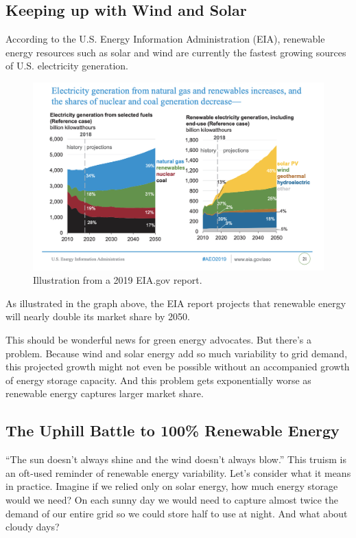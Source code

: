 \documentclass[hidelinks,12pt,a4paper]{article}
\begin{document}
\subsection{Keeping up with Wind and Solar}
According to the U.S. Energy Information Administration (EIA), renewable energy resources such as solar and wind are currently the fastest growing sources of U.S. electricity generation. \cite{EIAForecastsRenewables}

\begin{figure}[ht!]
    \centering
    \includegraphics[width=1.00\textwidth]{EIA-2019-energy-generation-projections.png}
    \caption{Illustration from a 2019 EIA.gov report. \cite{EIAForecastsRenewables}}
\end{figure}
\FloatBarrier

As illustrated in the graph above, the EIA report projects that renewable energy will nearly double its market share by 2050.

This should be wonderful news for green energy advocates. But there's a problem. Because wind and solar energy add so much variability to grid demand, this projected growth might not even be possible without an accompanied growth of energy storage capacity. And this problem gets exponentially worse as renewable energy captures larger market share.

\subsection{The Uphill Battle to 100\% Renewable Energy}
“The sun doesn’t always shine and the wind doesn’t always blow.” This truism is an oft-used reminder of renewable energy variability. Let's consider what it means in practice. Imagine if we relied only on solar energy, how much energy storage would we need? On each sunny day we would need to capture almost twice the demand of our entire grid so we could store half to use at night. And what about cloudy days?
\end{document}
